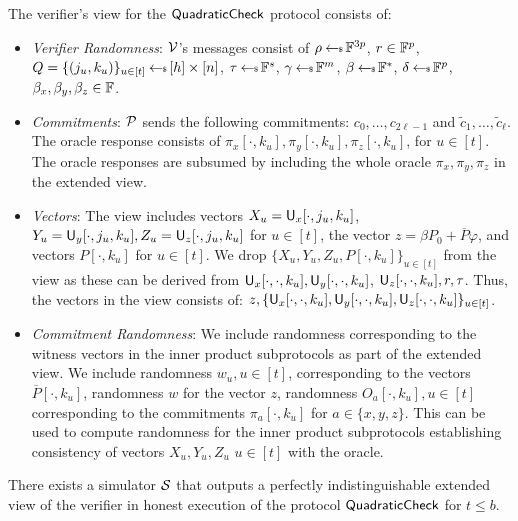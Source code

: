 The verifier's view for the $\mathsf{QuadraticCheck}$ protocol consists  of:
\begin{itemize}
	\item {\em Verifier Randomness}: $\mathcal{V}$'s messages consist of $\rho\hskip2.3pt{\gets\!\!\mbox{\tiny${\$}$\normalsize}}\, \mathbb{F}^{3p}$, $r\in\mathbb{F}^p$, $Q=\{(j_u,k_u)\}_{u\in[t]}\hskip2.3pt{\gets\!\!\mbox{\tiny${\$}$\normalsize}}\, [h]\times [n]$, $\tau\hskip2.3pt{\gets\!\!\mbox{\tiny${\$}$\normalsize}}\, \mathbb{F}^s$, $\gamma\hskip2.3pt{\gets\!\!\mbox{\tiny${\$}$\normalsize}}\, \mathbb{F}^m$, $\beta\hskip2.3pt{\gets\!\!\mbox{\tiny${\$}$\normalsize}}\, \mathbb{F}^\ast$, $\delta\hskip2.3pt{\gets\!\!\mbox{\tiny${\$}$\normalsize}}\, \mathbb{F}^p$, $\beta_x, \beta_y, \beta_z\in \mathbb{F}$.
	\item {\em Commitments}: $\mathcal{P}$ sends the following commitments: $c_0,\ldots, c_{2\ell-1}$ and $\tilde{c}_1, \ldots, \tilde{c}_{\ell}$. The oracle response consists of $\pi_x[\cdot,k_u], \pi_y[\cdot,k_u], \pi_z[\cdot,k_u]$, for $u\in[t]$. The oracle responses are subsumed by including the whole oracle $\pi_x, \pi_y, \pi_z$ in the extended view.
	\item {\em Vectors}: The view includes vectors $X_u=\mathsf{U}_x[\cdot,j_u,k_u]$, $Y_u=\mathsf{U}_y[\cdot,j_u,k_u], Z_u=\mathsf{U}_z[\cdot,j_u,k_u]$ for $u\in[t]$, the vector $z = \beta P_0 + \overline{P} \varphi$, and vectors $P[\cdot, k_u]$ for $u\in[t]$. We drop $\{X_u,Y_u,Z_u, P[\cdot,k_u]\}_{u\in[t]}$ from the view as these can be derived from $\mathsf{U}_x[\cdot, \cdot,k_u], \mathsf{U}_y[\cdot,\cdot,k_u]$, $\mathsf{U}_z[\cdot,\cdot,k_u], r, \tau$. Thus, the vectors in the view consists of: $z, \{\mathsf{U}_x[\cdot, \cdot,k_u], \mathsf{U}_y[\cdot,\cdot,k_u], \mathsf{U}_z[\cdot,\cdot,k_u]\}_{u\in[t]}$.
	\item {\em Commitment Randomness}: We include randomness corresponding to the witness vectors in the inner product subprotocols as part of the extended view. We include randomness $w_u, u\in[t]$, corresponding to the vectors $\overline{P}[\cdot,k_u]$, randomness $w$ for the vector $z$, randomness $O_a[\cdot,k_u], u\in[t]$ corresponding to the commitments $\pi_a[\cdot,k_u]$ for $a\in \{x,y,z\}$. This can be used to compute randomness for the inner product subprotocols establishing consistency of vectors $X_u, Y_u, Z_u$ $ u\in[t]$ with the oracle.
\end{itemize}

\begin{lemma}\label{lem:simquadcheck}
		There exists a simulator $\mathcal{S}$ that outputs a perfectly indistinguishable extended view of the verifier in honest execution of the protocol $\mathsf{QuadraticCheck}$ for $t\leq b$.
\end{lemma}

